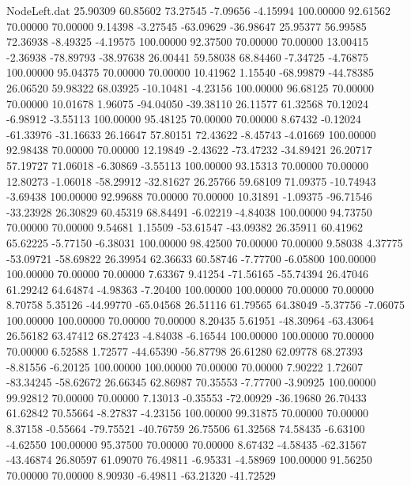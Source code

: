 \begin{filecontents}{NodeLeft.dat}
  25.90309   60.85602   73.27545    -7.09656   -4.15994  100.00000   92.61562   70.00000   70.00000    9.14398   -3.27545  -63.09629  -36.98647
  25.95377   56.99585   72.36938    -8.49325   -4.19575  100.00000   92.37500   70.00000   70.00000   13.00415   -2.36938  -78.89793  -38.97638
  26.00441   59.58038   68.84460    -7.34725   -4.76875  100.00000   95.04375   70.00000   70.00000   10.41962    1.15540  -68.99879  -44.78385
  26.06520   59.98322   68.03925   -10.10481   -4.23156  100.00000   96.68125   70.00000   70.00000   10.01678    1.96075  -94.04050  -39.38110
  26.11577   61.32568   70.12024    -6.98912   -3.55113  100.00000   95.48125   70.00000   70.00000    8.67432   -0.12024  -61.33976  -31.16633
  26.16647   57.80151   72.43622    -8.45743   -4.01669  100.00000   92.98438   70.00000   70.00000   12.19849   -2.43622  -73.47232  -34.89421
  26.20717   57.19727   71.06018    -6.30869   -3.55113  100.00000   93.15313   70.00000   70.00000   12.80273   -1.06018  -58.29912  -32.81627
  26.25766   59.68109   71.09375   -10.74943   -3.69438  100.00000   92.99688   70.00000   70.00000   10.31891   -1.09375  -96.71546  -33.23928
  26.30829   60.45319   68.84491    -6.02219   -4.84038  100.00000   94.73750   70.00000   70.00000    9.54681    1.15509  -53.61547  -43.09382
  26.35911   60.41962   65.62225    -5.77150   -6.38031  100.00000   98.42500   70.00000   70.00000    9.58038    4.37775  -53.09721  -58.69822
  26.39954   62.36633   60.58746    -7.77700   -6.05800  100.00000  100.00000   70.00000   70.00000    7.63367    9.41254  -71.56165  -55.74394
  26.47046   61.29242   64.64874    -4.98363   -7.20400  100.00000  100.00000   70.00000   70.00000    8.70758    5.35126  -44.99770  -65.04568
  26.51116   61.79565   64.38049    -5.37756   -7.06075  100.00000  100.00000   70.00000   70.00000    8.20435    5.61951  -48.30964  -63.43064
  26.56182   63.47412   68.27423    -4.84038   -6.16544  100.00000  100.00000   70.00000   70.00000    6.52588    1.72577  -44.65390  -56.87798
  26.61280   62.09778   68.27393    -8.81556   -6.20125  100.00000  100.00000   70.00000   70.00000    7.90222    1.72607  -83.34245  -58.62672
  26.66345   62.86987   70.35553    -7.77700   -3.90925  100.00000   99.92812   70.00000   70.00000    7.13013   -0.35553  -72.00929  -36.19680
  26.70433   61.62842   70.55664    -8.27837   -4.23156  100.00000   99.31875   70.00000   70.00000    8.37158   -0.55664  -79.75521  -40.76759
  26.75506   61.32568   74.58435    -6.63100   -4.62550  100.00000   95.37500   70.00000   70.00000    8.67432   -4.58435  -62.31567  -43.46874
  26.80597   61.09070   76.49811    -6.95331   -4.58969  100.00000   91.56250   70.00000   70.00000    8.90930   -6.49811  -63.21320  -41.72529

\end{filecontents}
